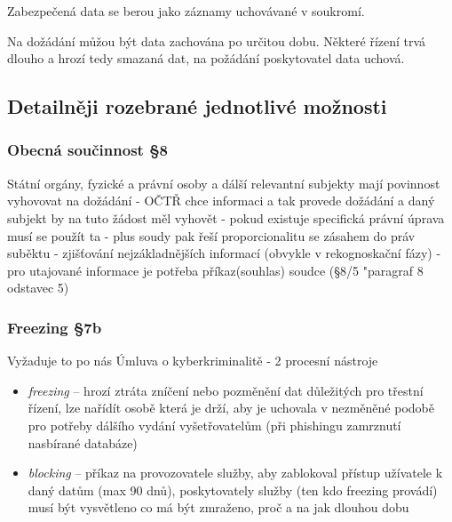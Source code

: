 Zabezpečená data se berou jako záznamy uchovávané v soukromí.

Na dožádání můžou být data zachována po určitou dobu. Některé řízení trvá dlouho a hrozí tedy smazaná dat, na požádání poskytovatel data uchová.

\subsection{Detailněji rozebrané jednotlivé možnosti}
\subsubsection*{Obecná součinnost §8}
Státní orgány, fyzické a právní osoby a dálší relevantní subjekty mají povinnost vyhovovat na
dožádání - OČTŘ chce informaci a tak provede dožádání a daný subjekt by na tuto žádost měl
vyhovět - pokud existuje specifická právní úprava musí se použít ta - plus soudy pak řeší
proporcionalitu se zásahem do práv suběktu - zjišťování nejzákladnějších informací (obvykle v
rekognoskační fázy) - pro utajované informace je potřeba příkaz(souhlas) soudce (§8/5 "paragraf 8
odstavec 5)
\subsubsection*{Freezing §7b}
Vyžaduje to po nás Úmluva o kyberkriminalitě - 2 procesní nástroje
\begin{itemize}
    \item \textit{freezing} -- hrozí ztráta zníčení nebo pozměnění dat důležitých pro třestní řízení, lze nařídít osobě která je drží, aby je uchovala v nezměněné podobě pro potřeby dálšího vydání vyšetřovatelům (při phishingu zamrznutí nasbírané databáze)
    \item \textit{blocking} -- příkaz na provozovatele služby, aby zablokoval přístup užívatele k daný datům (max 90 dnů), poskytovately služby (ten kdo freezing provádí) musí být vysvětleno co má být zmraženo, proč a na jak dlouhou dobu
\end{itemize}

